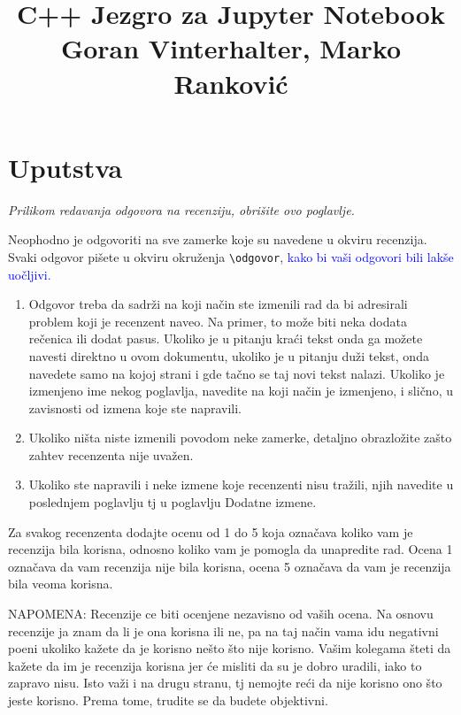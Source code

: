 \documentclass[a4paper]{report}
\newcommand{\odgovor}[1]{\textcolor{blue}{#1}}
\begin{document}
\title{C++ Jezgro za Jupyter Notebook\\ \small{Goran Vinterhalter, Marko Ranković}}

\maketitle
\tableofcontents

\chapter{Uputstva}
\emph{Prilikom redavanja odgovora na recenziju, obrišite ovo poglavlje.}

Neophodno je odgovoriti na sve zamerke koje su navedene u okviru recenzija.
Svaki odgovor pišete u okviru okruženja \verb"\odgovor", \odgovor{kako bi vaši odgovori bili lakše uočljivi.} 
\begin{enumerate}

\item Odgovor treba da sadrži na koji način ste izmenili rad da bi adresirali problem koji je recenzent naveo. Na primer, to može biti neka dodata rečenica ili dodat pasus. Ukoliko je u pitanju kraći tekst onda ga možete navesti direktno u ovom dokumentu, ukoliko je u pitanju duži tekst, onda navedete samo na kojoj strani i gde tačno se taj novi tekst nalazi. Ukoliko je izmenjeno ime nekog poglavlja, navedite na koji način je izmenjeno, i slično, u zavisnosti od izmena koje ste napravili. 

\item Ukoliko ništa niste izmenili povodom neke zamerke, detaljno obrazložite zašto zahtev recenzenta nije uvažen.

\item Ukoliko ste napravili i neke izmene koje recenzenti nisu tražili, njih navedite u poslednjem poglavlju tj u poglavlju Dodatne izmene.
\end{enumerate}

Za svakog recenzenta dodajte ocenu od 1 do 5 koja označava koliko vam je recenzija bila korisna, odnosno koliko vam je pomogla da unapredite rad. Ocena 1 označava da vam recenzija nije bila korisna, ocena 5 označava da vam je recenzija bila veoma korisna. 

NAPOMENA: Recenzije ce biti ocenjene nezavisno od vaših ocena. Na osnovu recenzije ja znam da li je ona korisna ili ne, pa na taj način vama idu negativni poeni ukoliko kažete da je korisno nešto što nije korisno. Vašim kolegama šteti da kažete da im je recenzija korisna jer će misliti da su je dobro uradili, iako to zapravo nisu. Isto važi i na drugu stranu, tj nemojte reći da nije korisno ono što jeste korisno. Prema tome, trudite se da budete objektivni. 
\end{document}
